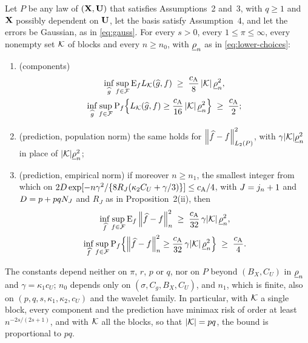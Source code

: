 \begin{theorem}
\label{thm:lower}
Let $P$ be any law of $(\mathbf{X},\mathbf{U})$ that satisfies Assumptions~2 and~3, with
$q \ge 1$ and $\mathbf{X}$ possibly dependent on $\mathbf{U}$, let the basis satisfy
Assumption~4, and let the errors be Gaussian, as in \eqref{eq:gauss}. For
every $s > 0$, every $1 \le \pi \le \infty$, every nonempty set $\mathcal{K}$ of
blocks and every $n \ge n_{0}$, with $\underline{\rho}_{n}$ as in \eqref{eq:lower-choices}:
\begin{enumerate}
\item[(i)] (components)
\begin{gather*}
  \inf_{\widehat{g}}\sup_{f\in\mathcal{F}}\mathrm{E}_{f}L_{\mathcal{K}}(\widehat{g},f)
  \;\ge\; \frac{c_{\mathrm{A}}}{8}\,|\mathcal{K}|\,\underline{\rho}_{n}^{2},
  \\
  \inf_{\widehat{g}}\sup_{f\in\mathcal{F}}\mathrm{P}_{f}\Bigl\{L_{\mathcal{K}}(\widehat{g},f)
  \ge \frac{c_{\mathrm{A}}}{16}\,|\mathcal{K}|\,\underline{\rho}_{n}^{2}\Bigr\} \;\ge\; \frac{c_{\mathrm{A}}}{2} ;
\end{gather*}
\item[(ii)] (prediction, population norm) the same holds for
$\left\lVert \widehat{f}-f \right\rVert_{L_2(P)}^{2}$, with $\gamma|\mathcal{K}|\underline{\rho}_{n}^{2}$ in place of
$|\mathcal{K}|\underline{\rho}_{n}^{2}$;
\item[(iii)] (prediction, empirical norm) if moreover $n \ge n_{1}$, the
smallest integer from which on
$2D\exp[-n\gamma^{2}/\{8R_{J}(\kappa_2C_U + \gamma/3)\}] \le c_{\mathrm{A}}/4$, with
$J = j_n + 1$ and $D = p + pqN_{J}$ and $R_J$ as in Proposition~2(ii), then
\begin{gather*}
  \inf_{\widehat{f}}\sup_{f\in\mathcal{F}}\mathrm{E}_{f}\left\lVert \widehat{f}-f \right\rVert_{n}^{2}
  \;\ge\; \frac{c_{\mathrm{A}}}{32}\,\gamma|\mathcal{K}|\,\underline{\rho}_{n}^{2},
  \\
  \inf_{\widehat{f}}\sup_{f\in\mathcal{F}}\mathrm{P}_{f}\Bigl\{\left\lVert \widehat{f}-f \right\rVert_{n}^{2}
  \ge \frac{c_{\mathrm{A}}}{32}\,\gamma|\mathcal{K}|\,\underline{\rho}_{n}^{2}\Bigr\} \;\ge\; \frac{c_{\mathrm{A}}}{4} .
\end{gather*}
\end{enumerate}
The constants depend neither on $\pi$, $r$, $p$ or $q$, nor on $P$ beyond
$(B_X,C_U)$ in $\underline{\rho}_{n}$ and $\gamma = \kappa_1c_U$; $n_{0}$ depends only on
$(\sigma,C_g,B_X,C_U)$, and $n_{1}$, which is finite, also on
$(p,q,s,\kappa_1,\kappa_2,c_U)$ and the wavelet family. In particular, with
$\mathcal{K}$ a single block, every component and the prediction have minimax risk
of order at least $n^{-2s/(2s+1)}$, and with $\mathcal{K}$ all the blocks, so that
$|\mathcal{K}| = pq$, the bound is proportional to $pq$.
\end{theorem}

